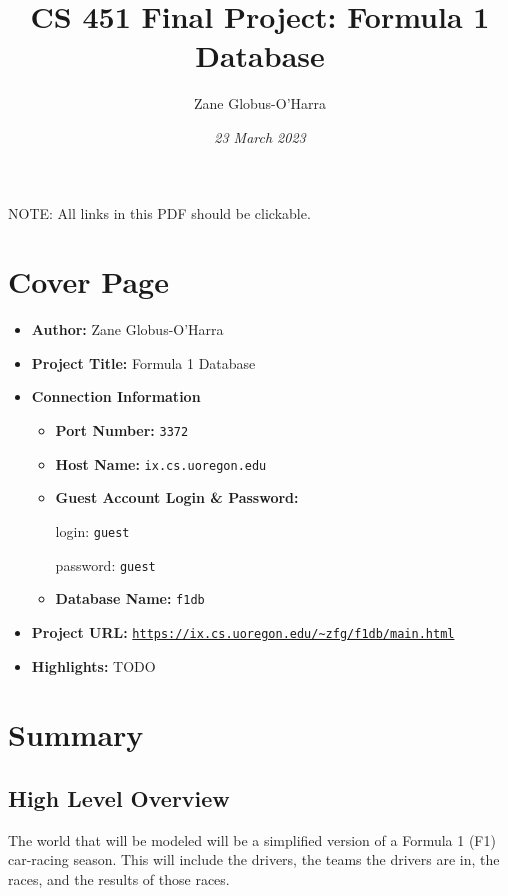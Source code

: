 \documentclass{article} %
\title{CS 451 Final Project: Formula 1 Database}
\author{Zane Globus-O'Harra}
\date{\textit{23 March 2023}}
\begin{document}
\maketitle

\tableofcontents
\vspace{1.5cm}

\noindent
NOTE: All links in this PDF should be clickable.
\newpage

\section{Cover Page}

\begin{itemize}
    \item \textbf{Author:} Zane Globus-O'Harra
    
    \item \textbf{Project Title:} Formula 1 Database

    \item \textbf{Connection Information}
    \begin{itemize}
        \item \textbf{Port Number:} \texttt{3372}

        \item \textbf{Host Name:} \texttt{ix.cs.uoregon.edu}

        \item \textbf{Guest Account Login \& Password:} 

        login: \texttt{guest}

        password: \texttt{guest}

        \item \textbf{Database Name:} \texttt{f1db}

    \end{itemize}

    \item \textbf{Project URL:}
    \href{https://ix.cs.uoregon.edu/~zfg/f1db/main.html}{\texttt{https://ix.cs.uoregon.edu/\~{}zfg/f1db/main.html}}

    \item \textbf{Highlights:} TODO
\end{itemize}

\section{Summary}

\subsection{High Level Overview}
The world that will be modeled will be a simplified version of a Formula
1 (F1) car-racing season. This will include the drivers, the teams the
drivers are in, the races, and the results of those races. 
\end{document}
